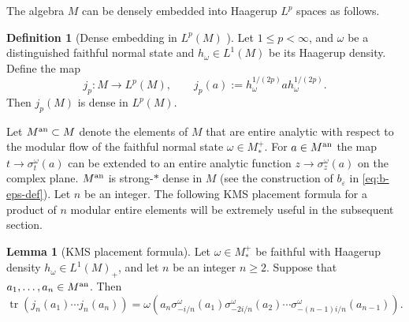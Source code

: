 \documentclass[11pt,a4paper]{article}
\theoremstyle{plain}
\numberwithin{theorem}{section}
\theoremstyle{definition}
\newtheorem{definition}[theorem]{Definition}
\newtheorem{lemma}[theorem]{Lemma}
\newcommand{\?}{\overset{?}{=}}
\DeclareMathOperator{\tr}{tr}
\newcommand{\ve}{\varepsilon}
\begin{document}
The algebra $M$ can be densely embedded into Haagerup $L^p$ spaces as follows.
\begin{definition}[Dense embedding in $L^p(M)$ \cite{KOSAKI198429}]\label{def:symmetricembedding}
    Let \(1\leq p<\infty\), and $\omega$ be a distinguished faithful normal state and $h_\omega\in L^1(M)$ be its Haagerup density. Define the map
    \[
        j_p:M\longrightarrow L^p(M),
        \qquad
        j_p(a)
        :=
        h_\omega^{1/(2p)}a h_\omega^{1/(2p)}.
    \]
    Then $j_p(M)$ is dense in $L^p(M)$.
\end{definition}

Let $M^{\rm an} \subset M$ denote the elements of $M$ that are entire analytic with respect to the modular flow of the faithful normal state $\omega\in M_*^+$. For $a\in M^{\rm an}$ the map $t\to \sigma_t^{\omega}(a)$ can be extended to an entire analytic function $z\to\sigma_z^{\omega}(a)$ on the complex plane.  $M^{\rm an}$ is strong-$*$ dense in $M$ (see the construction of $b_\ve$ in \eqref{eq:b-eps-def}). Let $n$ be an integer. The following KMS placement formula for a product of $n$ modular entire elements will be extremely useful in the subsequent section.
\begin{lemma}[KMS placement formula]
\label{lem:KMS-placement}
Let $\omega\in M_*^+$ be faithful with Haagerup density $h_\omega\in L^1(M)_+$, and let $n$ be an integer \(n\geq2\).  Suppose that
\(a_1,\ldots,a_n\in M^{\rm an}\). Then
\begin{equation}
\label{eq:KMS-placement}
\tr\!\left(j_n(a_1)\cdots j_n(a_n)\right)
=
\omega\!\left(
a_n
\sigma_{-i/n}^\omega(a_1)
\sigma_{-2i/n}^\omega(a_2)
\cdots
\sigma_{-(n-1)i/n}^\omega(a_{n-1})
\right).
\end{equation}
\end{lemma}
\end{document}
